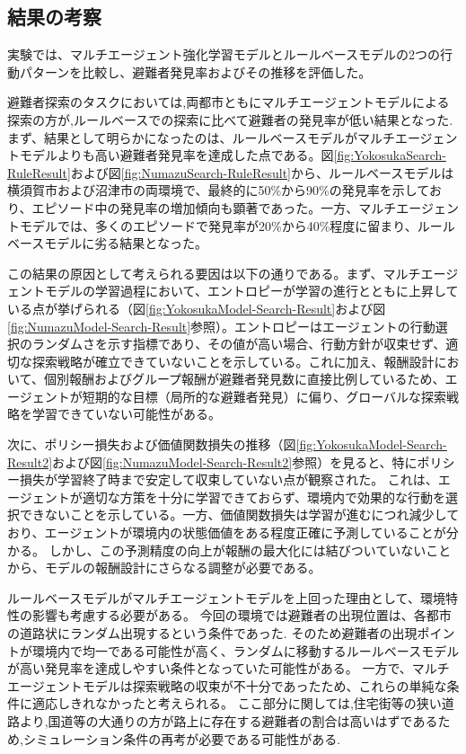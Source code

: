\subsection{結果の考察}
実験では、マルチエージェント強化学習モデルとルールベースモデルの2つの行動パターンを比較し、避難者発見率およびその推移を評価した。

避難者探索のタスクにおいては,両都市ともにマルチエージェントモデルによる探索の方が,ルールベースでの探索に比べて避難者の発見率が低い結果となった.
まず、結果として明らかになったのは、ルールベースモデルがマルチエージェントモデルよりも高い避難者発見率を達成した点である。図\ref{fig:YokosukaSearch-RuleResult}および図\ref{fig:NumazuSearch-RuleResult}から、ルールベースモデルは横須賀市および沼津市の両環境で、最終的に50\%から90\%の発見率を示しており、エピソード中の発見率の増加傾向も顕著であった。一方、マルチエージェントモデルでは、多くのエピソードで発見率が20\%から40\%程度に留まり、ルールベースモデルに劣る結果となった。

この結果の原因として考えられる要因は以下の通りである。まず、マルチエージェントモデルの学習過程において、エントロピーが学習の進行とともに上昇している点が挙げられる（図\ref{fig:YokosukaModel-Search-Result}および図\ref{fig:NumazuModel-Search-Result}参照）。エントロピーはエージェントの行動選択のランダムさを示す指標であり、その値が高い場合、行動方針が収束せず、適切な探索戦略が確立できていないことを示している。これに加え、報酬設計において、個別報酬およびグループ報酬が避難者発見数に直接比例しているため、エージェントが短期的な目標（局所的な避難者発見）に偏り、グローバルな探索戦略を学習できていない可能性がある。

次に、ポリシー損失および価値関数損失の推移（図\ref{fig:YokosukaModel-Search-Result2}および図\ref{fig:NumazuModel-Search-Result2}参照）を見ると、特にポリシー損失が学習終了時まで安定して収束していない点が観察された。
これは、エージェントが適切な方策を十分に学習できておらず、環境内で効果的な行動を選択できないことを示している。一方、価値関数損失は学習が進むにつれ減少しており、エージェントが環境内の状態価値をある程度正確に予測していることが分かる。
しかし、この予測精度の向上が報酬の最大化には結びついていないことから、モデルの報酬設計にさらなる調整が必要である。

ルールベースモデルがマルチエージェントモデルを上回った理由として、環境特性の影響も考慮する必要がある。
今回の環境では避難者の出現位置は、各都市の道路状にランダム出現するという条件であった.
そのため避難者の出現ポイントが環境内で均一である可能性が高く、ランダムに移動するルールベースモデルが高い発見率を達成しやすい条件となっていた可能性がある。
一方で、マルチエージェントモデルは探索戦略の収束が不十分であったため、これらの単純な条件に適応しきれなかったと考えられる。
ここ部分に関しては,住宅街等の狭い道路より,国道等の大通りの方が路上に存在する避難者の割合は高いはずであるため,シミュレーション条件の再考が必要である可能性がある.

